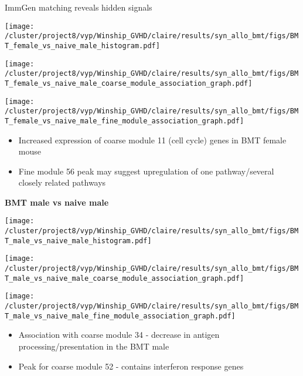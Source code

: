 \documentclass[final,hyperref={pdfpagelabels=false}]{beamer}
\begin{document}
\begin{frame}{}
\begin{columns}[t]
\begin{column}{.36\linewidth}
\begin{block}{ImmGen matching reveals hidden signals}
      \begin{minipage}{0.30\textwidth}
        \texttt{[image: /cluster/project8/vyp/Winship\_GVHD/claire/results/syn\_allo\_bmt/figs/BMT\_female\_vs\_naive\_male\_histogram.pdf]}
      \end{minipage}
  \hfill 
\begin{minipage}{0.30\textwidth}
        \texttt{[image: /cluster/project8/vyp/Winship\_GVHD/claire/results/syn\_allo\_bmt/figs/BMT\_female\_vs\_naive\_male\_coarse\_module\_association\_graph.pdf]}
      \end{minipage}
\hfill
\begin{minipage}{0.30\textwidth}
        \texttt{[image: /cluster/project8/vyp/Winship\_GVHD/claire/results/syn\_allo\_bmt/figs/BMT\_female\_vs\_naive\_male\_fine\_module\_association\_graph.pdf]}
      \end{minipage}
\begin{itemize}
\item Increased expression of coarse module 11 (cell cycle) genes in BMT female mouse 
\item Fine module 56 peak may suggest upregulation of one pathway/several closely related pathways 
\end{itemize}
\vspace{2cm}

{\bf BMT male vs naive male}
\vfill
\begin{minipage}{0.30\textwidth}
        \texttt{[image: /cluster/project8/vyp/Winship\_GVHD/claire/results/syn\_allo\_bmt/figs/BMT\_male\_vs\_naive\_male\_histogram.pdf]}
      \end{minipage}
  \hfill
      \begin{minipage}{0.30\textwidth}
        \texttt{[image: /cluster/project8/vyp/Winship\_GVHD/claire/results/syn\_allo\_bmt/figs/BMT\_male\_vs\_naive\_male\_coarse\_module\_association\_graph.pdf]}
      \end{minipage}
  \hfill
  \begin{minipage}{0.30\textwidth}
        \texttt{[image: /cluster/project8/vyp/Winship\_GVHD/claire/results/syn\_allo\_bmt/figs/BMT\_male\_vs\_naive\_male\_fine\_module\_association\_graph.pdf]}
  \end{minipage}
  \hfill
  \begin{itemize}
  \item Association with coarse module 34 - decrease in antigen processing/presentation in the BMT male
  \item Peak for coarse module 52 - contains interferon response genes  
    \end{itemize}
\end{block}
\vspace{3cm}


\end{column}
\end{columns}
\end{frame}
\end{document}
